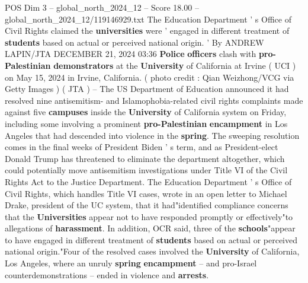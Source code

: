 \begin{textsample}{POS Dim 3 – global\_north\_2024\_12 – Score 18.00 – global\_north\_2024\_12/119146929.txt}  \label{ex:f3_pos_232}
The Education Department ' s Office of Civil Rights claimed the \textbf{universities} were ' engaged in different treatment of \textbf{students} based on actual or perceived national origin. ' By ANDREW LAPIN/JTA DECEMBER 21, 2024 03:36 \textbf{Police} \textbf{officers} clash with \textbf{pro-Palestinian} \textbf{demonstrators} at the \textbf{University} of California at Irvine ( UCI ) on May 15, 2024 in Irvine, California. ( photo credit : Qian Weizhong/VCG via Getty Images ) ( JTA ) -- The US Department of Education announced it had resolved nine antisemitism- and Islamophobia-related civil rights complaints made against five \textbf{campuses} inside the \textbf{University} of California system on Friday, including some involving a prominent \textbf{pro-Palestinian} \textbf{encampment} in Los Angeles that had descended into violence in the \textbf{spring}.
The sweeping resolution comes in the final weeks of President Biden ' s term, and as President-elect Donald Trump has threatened to eliminate the department altogether, which could potentially move antisemitism investigations under Title VI of the Civil Rights Act to the Justice Department.
The Education Department ' s Office of Civil Rights, which handles Title VI cases, wrote in an open letter to Michael Drake, president of the UC system, that it had"identified compliance concerns that the \textbf{Universities} appear not to have responded promptly or effectively"to allegations of \textbf{harassment}.
In addition, OCR said, three of the \textbf{schools}"appear to have engaged in different treatment of \textbf{students} based on actual or perceived national origin."Four of the resolved cases involved the \textbf{University} of California, Los Angeles, where an unruly \textbf{spring} \textbf{encampment} -- and pro-Israel counterdemonstrations -- ended in violence and \textbf{arrests}.

\end{textsample}
